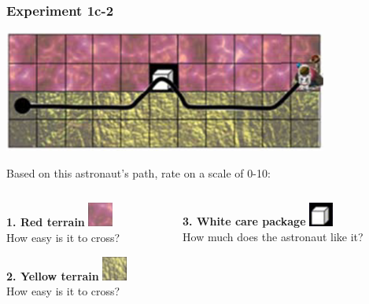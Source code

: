 \documentclass{beamer}
\begin{document}
\begin{frame}
\frametitle{Experiment 1c-2}
\begin{center}
\includegraphics[width=0.8\textwidth]{experiment_1c-2.png}
\end{center}
\vspace{0.3cm}
Based on this astronaut's path, rate on a scale of 0-10:
\begin{columns}
\begin{column}{0.5\textwidth}
\textbf{1. Red terrain} \includegraphics[width=0.8cm]{red_terrain.png}\\
How easy is it to cross?
\vspace{0.3cm}

\textbf{2. Yellow terrain} \includegraphics[width=0.8cm]{yellow_terrain.png}\\
How easy is it to cross?
\end{column}
\begin{column}{0.5\textwidth}
\textbf{3. White care package} \includegraphics[width=0.8cm]{white_carepackage.png}\\
How much does the astronaut like it?
\vspace{0.3cm}
\end{column}
\end{columns}
\end{frame}
\end{document}
